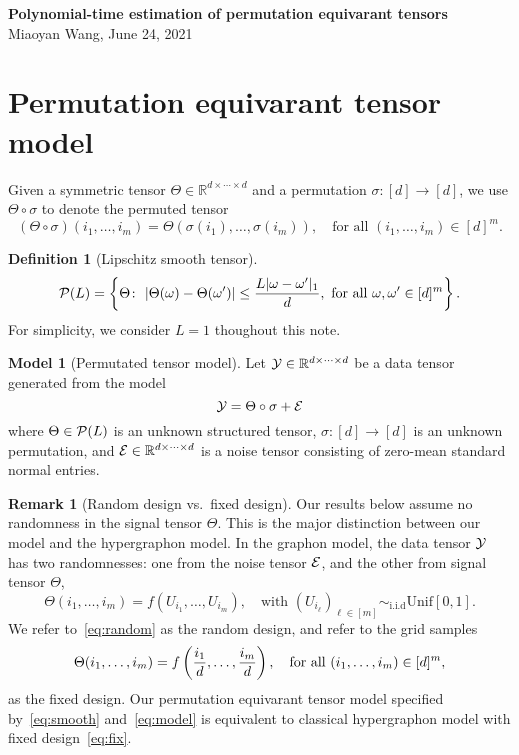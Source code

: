 \documentclass[10pt]{article}
\theoremstyle{definition}
\newtheorem{model}{Model}
\theoremstyle{definition}
\newtheorem{defn}{Definition}
\newtheorem{rmk}{Remark}
\theoremstyle{definition}
\begin{document}
\begin{center}
{\bf \large Polynomial-time estimation of permutation equivarant tensors}\\

{Miaoyan Wang, June 24, 2021}
\end{center}
\section{Permutation equivarant tensor model}
Given a symmetric tensor $\Theta\in\mathbb{R}^{d\times \cdots\times d}$ and a permutation $\sigma\colon[d]\to[d]$, we use $\Theta\circ\sigma$ to denote the permuted tensor
\[
(\Theta \circ \sigma)(i_1,\ldots,i_m)=\Theta(\sigma(i_1),\ldots,\sigma(i_m)), \quad \text{for all }(i_1,\ldots, i_m)\in[d]^m.
\]


\begin{defn}[Lipschitz smooth tensor]
\begin{align}\label{eq:smooth}
\tP(L)=\left\{ \Theta\colon \ |\Theta(\omega)-\Theta(\omega')|\leq  {L|\omega-\omega'|_{1}\over d}, \ \text{for all }\omega, \omega'\in[d]^m\right\}.
\end{align}
For simplicity, we consider $L=1$ thoughout this note. 
\end{defn}
\begin{model}[Permutated tensor model]
Let $\mathcal{Y}\in\mathbb{R}^{d\times \cdots \times d}$ be a data tensor generated from the model
\begin{equation}\label{eq:model}
\mathcal{Y}=\Theta\circ \sigma +\mathcal{E}
\end{equation}
where $\Theta\in\mathcal{P}(L)$ is an unknown structured tensor, $\sigma\colon[d]\to[d]$ is an unknown permutation, and $\mathcal{E} \in\mathbb{R}^{d\times \cdots \times d}$ is a noise tensor consisting of zero-mean standard normal entries. 
\end{model}

\begin{rmk}[Random design vs.\ fixed design] Our results below assume no randomness in the signal tensor $\Theta$. This is the major distinction between our model and the hypergraphon model. In the graphon model, the data tensor $\mathcal{Y}$ has two randomnesses: one from the noise tensor $\mathcal{E}$, and the other from signal tensor $\Theta$, 
\begin{equation}\label{eq:random}
\Theta(i_1,\ldots,i_m)=f(U_{i_1}, \ldots,U_{i_m}), \quad \text{with }(U_{i_\ell})_{\ell\in[m]}\sim_{\text{i.i.d}} \text{Unif}[0,1]. 
\end{equation}
We refer to~\eqref{eq:random} as the random design, and refer to the grid samples
\begin{align}\label{eq:fix}
\Theta(i_1,\ldots,i_m)=f\left({i_1\over d},\ldots,{i_m\over d}\right), \quad \text{for all }(i_1,\ldots,i_m)\in[d]^m,
\end{align}
as the fixed design. Our permutation equivarant tensor model specified by~\eqref{eq:smooth} and~\eqref{eq:model} is equivalent to classical hypergraphon model with fixed design~\eqref{eq:fix}. 
\end{rmk}
\end{document}
